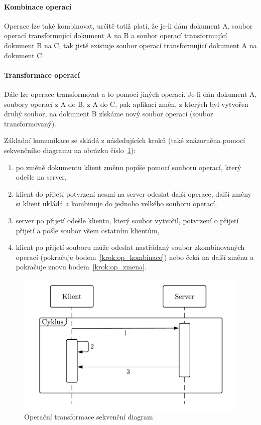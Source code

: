 \paragraph{Kombinace operací}
Operace lze také kombinovat, určitě totiž platí, že je-li dám dokument A, soubor operací transformující dokument A na B a soubor operací transformující dokument B na C, tak jistě existuje soubor operací transformující dokument A na dokument C.

\paragraph{Transformace operací}
Dále lze operace transformovat a to pomocí jiných operací.
Je-li dán dokument A, soubory operací z A do B, z A do C, pak aplikací změn, z kterých byl vytvořen druhý soubor, na dokument B získáme nový soubor operací (soubor transformovaný).~\cite{ot:codecommit}


Základní komunikace se skládá z následujících kroků (také znázorněna pomocí sekvenčního diagramu na obrázku číslo~\ref{fig:OP_diagram}):

\begin{enumerate}
    \item po změně dokumentu klient změnu popíše pomocí souboru operací, který odešle na server,\label{krok:op_zmena}
    \item klient do přijetí potvrzení nesmí na server odeslat další operace, další změny si klient ukládá a kombinuje do jednoho velkého souboru operací,\label{krok:op_kombinace}
    \item server po přijetí odešle klientu, který soubor vytvořil, potvrzení o přijetí přijetí a pošle soubor všem ostatním klientům,
    \item klient po přijetí souboru může odeslat nastřádaný soubor zkombinovaných operací (pokračuje bodem~\ref{krok:op_kombinace}) nebo čeká na další změnu a pokračuje znovu bodem~\ref{krok:op_zmena}.~\cite{ot:waveAddition}
\end{enumerate}

\begin{figure}[ht]
    \centering
    \includegraphics[width=\textwidth]{partials/analyza/OP_diagram.pdf}
    \caption{Operační transformace sekvenční diagram}\label{fig:OP_diagram}
\end{figure}

